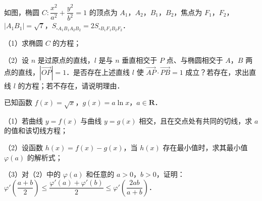 \endgroup
\begingroup
\renewenvironment{question}{\Needspace{0.5\textheight}}{}
\begin{question}
如图，椭圆 $C:\dfrac{x^2}{a^2}+\dfrac{y^2}{b^2}=1$ 的顶点为 $A_1$，$A_2$，$B_1$，$B_2$，焦点为 $F_1$，$F_2$，$|A_1B_1|=\sqrt7$，$S_{\square A_1B_1A_2B_2}=2S_{\square B_1F_1B_2F_2}$．

（1）求椭圆 $C$ 的方程；

（2）设 $n$ 是过原点的直线，$l$ 是与 $n$ 垂直相交于 $P$ 点、与椭圆相交于 $A$，$B$ 两点的直线，$|\overrightarrow{OP}|=1$．是否存在上述直线 $l$ 使 $\overrightarrow{AP}\cdot\overrightarrow{PB}=1$ 成立？若存在，求出直线 $l$ 的方程；若不存在，请说明理由．
\nopagebreak[4]
\begin{center}\end{center}
\nopagebreak[4]
\end{question}
\endgroup
\begin{question}
已知函数 $f(x)=\sqrt x$，$g(x)=a\ln x$，$a\in\mathbf R$．

（1）若曲线 $y=f(x)$ 与曲线 $y=g(x)$ 相交，且在交点处有共同的切线，求 $a$ 的值和该切线方程；

（2）设函数 $h(x)=f(x)-g(x)$，当 $h(x)$ 存在最小值时，求其最小值 $\varphi(a)$ 的解析式；

（3）对（2）中的 $\varphi(a)$ 和任意的 $a>0$，$b>0$，证明：$\varphi'\left(\dfrac{a+b}{2}\right)\leqslant\dfrac{\varphi'(a)+\varphi'(b)}{2}\leqslant\varphi'\left(\dfrac{2ab}{a+b}\right)$．

\end{question}